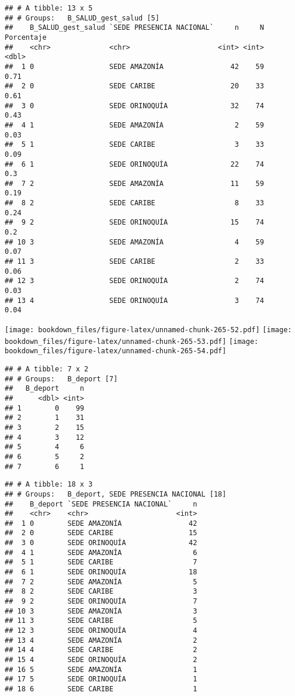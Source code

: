 \documentclass[]{article}
\theoremstyle{definition}
\theoremstyle{definition}
\theoremstyle{definition}
\theoremstyle{remark}
\begin{document}
\begin{verbatim}
## # A tibble: 13 x 5
## # Groups:   B_SALUD_gest_salud [5]
##    B_SALUD_gest_salud `SEDE PRESENCIA NACIONAL`     n     N Porcentaje
##    <chr>              <chr>                     <int> <int>      <dbl>
##  1 0                  SEDE AMAZONÍA                42    59       0.71
##  2 0                  SEDE CARIBE                  20    33       0.61
##  3 0                  SEDE ORINOQUÍA               32    74       0.43
##  4 1                  SEDE AMAZONÍA                 2    59       0.03
##  5 1                  SEDE CARIBE                   3    33       0.09
##  6 1                  SEDE ORINOQUÍA               22    74       0.3 
##  7 2                  SEDE AMAZONÍA                11    59       0.19
##  8 2                  SEDE CARIBE                   8    33       0.24
##  9 2                  SEDE ORINOQUÍA               15    74       0.2 
## 10 3                  SEDE AMAZONÍA                 4    59       0.07
## 11 3                  SEDE CARIBE                   2    33       0.06
## 12 3                  SEDE ORINOQUÍA                2    74       0.03
## 13 4                  SEDE ORINOQUÍA                3    74       0.04
\end{verbatim}

\texttt{[image: bookdown\_files/figure-latex/unnamed-chunk-265-52.pdf]}
\texttt{[image: bookdown\_files/figure-latex/unnamed-chunk-265-53.pdf]}
\texttt{[image: bookdown\_files/figure-latex/unnamed-chunk-265-54.pdf]}

\begin{verbatim}
## # A tibble: 7 x 2
## # Groups:   B_deport [7]
##   B_deport     n
##      <dbl> <int>
## 1        0    99
## 2        1    31
## 3        2    15
## 4        3    12
## 5        4     6
## 6        5     2
## 7        6     1
\end{verbatim}

\begin{verbatim}
## # A tibble: 18 x 3
## # Groups:   B_deport, SEDE PRESENCIA NACIONAL [18]
##    B_deport `SEDE PRESENCIA NACIONAL`     n
##    <chr>    <chr>                     <int>
##  1 0        SEDE AMAZONÍA                42
##  2 0        SEDE CARIBE                  15
##  3 0        SEDE ORINOQUÍA               42
##  4 1        SEDE AMAZONÍA                 6
##  5 1        SEDE CARIBE                   7
##  6 1        SEDE ORINOQUÍA               18
##  7 2        SEDE AMAZONÍA                 5
##  8 2        SEDE CARIBE                   3
##  9 2        SEDE ORINOQUÍA                7
## 10 3        SEDE AMAZONÍA                 3
## 11 3        SEDE CARIBE                   5
## 12 3        SEDE ORINOQUÍA                4
## 13 4        SEDE AMAZONÍA                 2
## 14 4        SEDE CARIBE                   2
## 15 4        SEDE ORINOQUÍA                2
## 16 5        SEDE AMAZONÍA                 1
## 17 5        SEDE ORINOQUÍA                1
## 18 6        SEDE CARIBE                   1
\end{verbatim}
\end{document}
